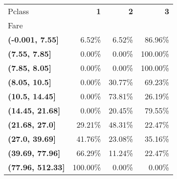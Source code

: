 \begin{tabular}{lrrr}
\toprule
Pclass & \textbf{1} & \textbf{2} & \textbf{3} \\
Fare &  &  &  \\
\midrule
\textbf{(-0.001, 7.55]} & 6.52\% & 6.52\% & 86.96\% \\
\textbf{(7.55, 7.85]} & 0.00\% & 0.00\% & 100.00\% \\
\textbf{(7.85, 8.05]} & 0.00\% & 0.00\% & 100.00\% \\
\textbf{(8.05, 10.5]} & 0.00\% & 30.77\% & 69.23\% \\
\textbf{(10.5, 14.45]} & 0.00\% & 73.81\% & 26.19\% \\
\textbf{(14.45, 21.68]} & 0.00\% & 20.45\% & 79.55\% \\
\textbf{(21.68, 27.0]} & 29.21\% & 48.31\% & 22.47\% \\
\textbf{(27.0, 39.69]} & 41.76\% & 23.08\% & 35.16\% \\
\textbf{(39.69, 77.96]} & 66.29\% & 11.24\% & 22.47\% \\
\textbf{(77.96, 512.33]} & 100.00\% & 0.00\% & 0.00\% \\
\bottomrule
\end{tabular}

